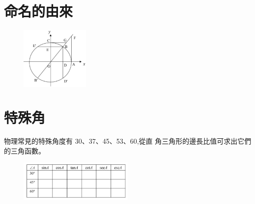 \documentclass[cn,10pt,math=newtx,chinesefont=founder]{elegantbook}
\begin{document}
\section{命名的由來}
\begin{figure}
    \includegraphics[width=0.3\textwidth]{image/單位圓2.png}

\end{figure}
\newpage

\section{特殊角}
    物理常見的特殊角度有 30、37、45、53、60,從直
    角三角形的邊長比值可求出它們的三角函數。
\begin{figure}[h]
    \flushleft
    \includegraphics[width=0.5\textwidth]{image/special.png}
\end{figure}
\end{document}
